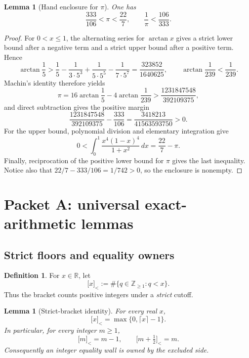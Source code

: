 \documentclass[11pt]{article}
\newtheorem{lemma}[theorem]{Lemma}
\theoremstyle{definition}
\newtheorem{definition}[theorem]{Definition}
\theoremstyle{remark}
\newcommand{\strictbr}[1]{\mathopen{[}#1\mathclose{]}_{<}}
\begin{document}
\begin{lemma}[Hand enclosure for \(\pi\)]
\label{lem:pi}
One has
\begin{equation}
 \frac{333}{106}<\pi<\frac{22}{7},
 \qquad
 \frac1\pi<\frac{106}{333}.
 \label{eq:pi-bounds}
\end{equation}
\end{lemma}

\begin{proof}
For \(0<x\leq1\), the alternating series for \(\arctan x\) gives a
strict lower bound after a negative term and a strict upper bound after a
positive term.  Hence
\[
 \arctan\frac15>
 \frac15-\frac1{3\cdot5^3}+\frac1{5\cdot5^5}
 -\frac1{7\cdot5^7}
 =\frac{323852}{1640625},
 \qquad
 \arctan\frac1{239}<\frac1{239}.
\]
Machin's identity therefore yields
\[
 \pi=16\arctan\frac15-4\arctan\frac1{239}
 >\frac{1231847548}{392109375},
\]
and direct subtraction gives the positive margin
\[
 \frac{1231847548}{392109375}-\frac{333}{106}
 =\frac{3418213}{41563593750}>0.
\]
For the upper bound, polynomial division and elementary integration give
\[
 0<\int_0^1\frac{x^4(1-x)^4}{1+x^2}\,dx
 =\frac{22}{7}-\pi.
\]
Finally, reciprocation of the positive lower bound for \(\pi\) gives the
last inequality.  Notice also that
\(22/7-333/106=1/742>0\), so the enclosure is nonempty.
\end{proof}

\section{Packet A: universal exact-arithmetic lemmas}

\subsection{Strict floors and equality owners}

\begin{definition}
For \(x\in\mathbb R\), let
\[
 \strictbr{x}:=\#\{q\in\mathbb Z_{\geq1}:q<x\}.
\]
Thus the bracket counts positive integers under a \emph{strict} cutoff.
\end{definition}

\begin{lemma}[Strict-bracket identity]
\label{lem:strict-bracket}
For every real \(x\),
\begin{equation}
 \strictbr{x}=\max\{0,\lceil x\rceil-1\}.
 \label{eq:strict-bracket}
\end{equation}
In particular, for every integer \(m\geq1\),
\[
 \strictbr{m}=m-1,
 \qquad
 \strictbr{m+\tfrac12}=m.
\]
Consequently an integer equality wall is owned by the excluded side.
\end{lemma}
\end{document}
